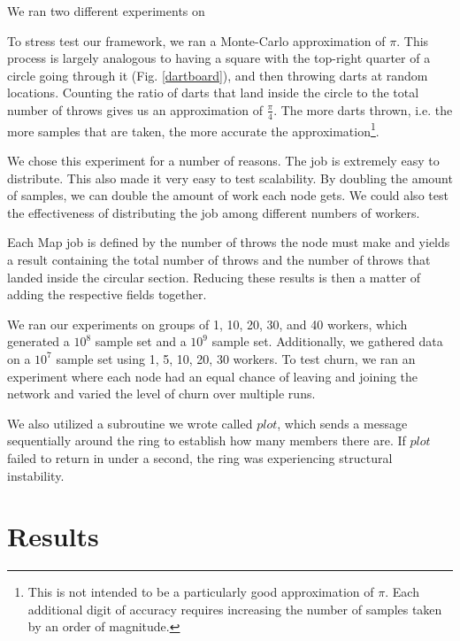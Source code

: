 \documentclass[10pt, conference, compsocconf]{IEEEtran}
\begin{document}
We ran two different experiments on


To stress test our framework, we ran a Monte-Carlo approximation of $\pi$. This process is largely analogous to having a square with the top-right quarter of a circle going through it (Fig. \ref{dartboard}), and then throwing darts at random locations.  Counting the ratio of darts that land inside the circle to the total number of throws gives us an approximation of $\frac{\pi}{4}$.  The more darts thrown, i.e. the more samples that are taken, the more accurate the approximation\footnote{This is not intended to be a particularly good approximation of $\pi$. Each additional digit of accuracy requires increasing the number of samples taken by an order of magnitude.}.

We chose this experiment for a number of reasons. The job is extremely easy to distribute.  This also made it very easy to test scalability. By doubling the amount of samples, we can double the amount of work each node gets.  We could also test the effectiveness of distributing the job among different numbers of workers.

Each Map job is defined by the number of throws the node must make and yields a result containing the total number of throws and the number of throws that landed inside the circular section.  Reducing these results is then a matter of adding the respective fields together. 



We ran our experiments on groups of 1, 10, 20, 30, and 40 workers, which generated a $10^{8}$ sample set and a $10^{9}$ sample set.  Additionally, we gathered data on a $10^{7}$ sample set using 1, 5, 10, 20, 30 workers.  To test churn, we ran an experiment where each node had an equal chance of leaving and joining the network and varied the level of churn over multiple runs.  

We also utilized a subroutine we wrote called $plot$, which sends a message sequentially around the ring to establish how many members there are.  If $plot$ failed to return in under a second, the ring was experiencing structural instability.

\section{Results}
\end{document}

